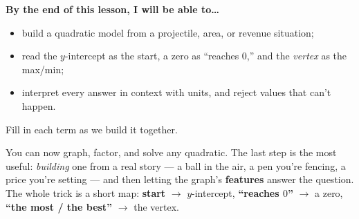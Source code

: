 \documentclass[10pt]{article}
\begin{document}

\vspace{0.06in}

\begin{objectivebox}
\textbf{By the end of this lesson, I will be able to\dots}
\begin{itemize}\setlength{\itemsep}{2pt}
  \item build a quadratic model from a projectile, area, or revenue situation;
  \item read the $y$-intercept as the start, a zero as ``reaches $0$,'' and the \emph{vertex} as the max/min;
  \item interpret every answer in context with units, and reject values that can't happen.
\end{itemize}
\end{objectivebox}

\vspace{0.06in}

\begin{vocabbox}
\small
Fill in each term as we build it together.
\par\vspace{2pt}
\end{vocabbox}

\begin{hookbox}
You can now graph, factor, and solve any quadratic. The last step is the most useful: \emph{building} one from a real
story --- a ball in the air, a pen you're fencing, a price you're setting --- and then letting the graph's
\textbf{features} answer the question. The whole trick is a short map: \textbf{start} $\to$ $y$-intercept,
\textbf{``reaches $0$''} $\to$ a zero, \textbf{``the most / the best''} $\to$ the vertex.
\end{hookbox}
\end{document}
